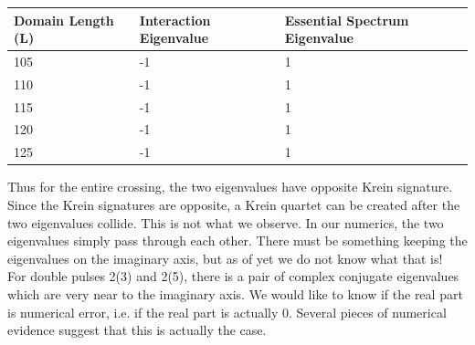 \documentclass[12pt]{article}
\begin{document}
\begin{table}[H]
\begin{tabular}{l|ll}
Domain Length (L)  & Interaction Eigenvalue & Essential Spectrum Eigenvalue \\ \hline
    105 & -1 &  1 \\
    110 & -1 &  1 \\
    115 & -1 &  1 \\
    120 & -1 &  1 \\
    125 & -1 &  1 \\
\end{tabular}
\end{table}

Thus for the entire crossing, the two eigenvalues have opposite Krein signature. Since the Krein signatures are opposite, a Krein quartet can be created after the two eigenvalues collide. This is not what we observe. In our numerics, the two eigenvalues simply pass through each other. There must be something keeping the eigenvalues on the imaginary axis, but as of yet we do not know what that is!\\


For double pulses 2(3) and 2(5), there is a pair of complex conjugate eigenvalues which are very near to the imaginary axis. We would like to know if the real part is numerical error, i.e. if the real part is actually 0. Several pieces of numerical evidence suggest that this is actually the case. 
\end{document}

